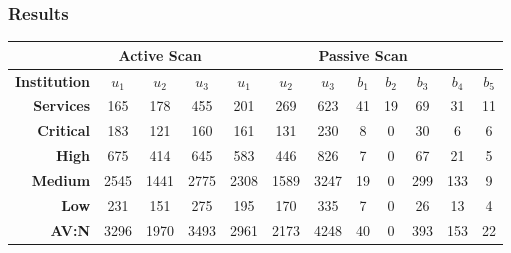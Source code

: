\documentclass[aspectratio=169,xcolor={usenames,dvipsnames}]{beamer}
\begin{document}
\begin{frame}
	\frametitle{Results}
	
	\begin{tabular}{r|ccc|ccc|ccccc|}
		\cline{2-12}
		\multicolumn{1}{l|}{}                         & \multicolumn{3}{c|}{\textbf{Active Scan}} & \multicolumn{8}{c|}{\textbf{Passive Scan}}                                                             \\ \hline
		\multicolumn{1}{|r|}{\textbf{Institution}}      & \textbf{$u_1$}    & \textbf{$u_2$}    & \textbf{$u_3$}   & \textbf{$u_1$} & \textbf{$u_2$} & \textbf{$u_3$} & \textbf{$b_1$} & \textbf{$b_2$} & \textbf{$b_3$} & \textbf{$b_4$} & \textbf{$b_5$} \\
		\multicolumn{1}{|r|}{\textbf{Services}} & 165            & 178            & 455           & 201         & 269         & 623         & 41          & 19          & 69          & 31          & 11          \\ \hline
		\multicolumn{1}{|r|}{\textbf{Critical}}       & 183            & 121            & 160           & 161         & 131         & 230         & 8           & 0           & 30          & 6           & 6           \\
		\multicolumn{1}{|r|}{\textbf{High}}          & 675            & 414            & 645           & 583         & 446         & 826         & 7           & 0           & 67          & 21          & 5           \\
		\multicolumn{1}{|r|}{\textbf{Medium}}        & 2545           & 1441           & 2775          & 2308        & 1589        & 3247        & 19          & 0           & 299         & 133         & 9           \\
		\multicolumn{1}{|r|}{\textbf{Low}}       & 231            & 151            & 275           & 195         & 170         & 335         & 7           & 0           & 26          & 13          & 4           \\
		\multicolumn{1}{|r|}{\textbf{AV:N}}           & 3296           & 1970           & 3493          & 2961        & 2173        & 4248        & 40          & 0           & 393         & 153         & 22          \\ \hline
	\end{tabular}
\end{frame}
\end{document}
